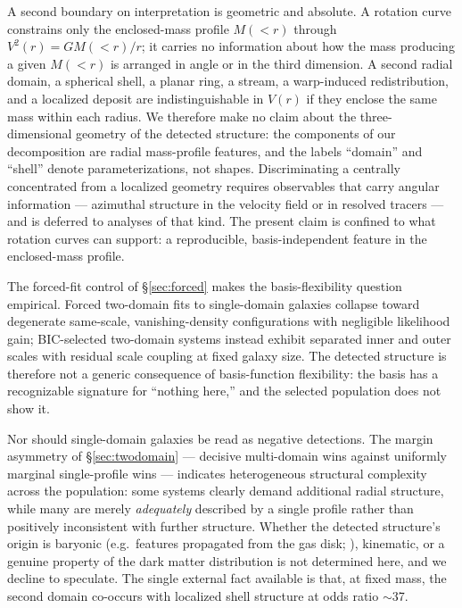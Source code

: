 \documentclass[twocolumn]{aastex631}
\begin{document}
A second boundary on interpretation is geometric and absolute. A rotation curve
constrains only the enclosed-mass profile $M({<}r)$ through $V^2(r) = G
M({<}r)/r$; it carries no information about how the mass producing a given
$M({<}r)$ is arranged in angle or in the third dimension. A second radial domain,
a spherical shell, a planar ring, a stream, a warp-induced redistribution, and a
localized deposit are indistinguishable in $V(r)$ if they enclose the same mass
within each radius. We therefore make no claim about the three-dimensional
geometry of the detected structure: the components of our decomposition are
radial mass-profile features, and the labels ``domain'' and ``shell'' denote
parameterizations, not shapes. Discriminating a centrally concentrated from a
localized geometry requires observables that carry angular information ---
azimuthal structure in the velocity field or in resolved tracers --- and is
deferred to analyses of that kind. The present claim is confined to what
rotation curves can support: a reproducible, basis-independent feature in the
enclosed-mass profile.

The forced-fit control of \S\ref{sec:forced} makes the basis-flexibility
question empirical. Forced two-domain fits to single-domain galaxies collapse
toward degenerate same-scale, vanishing-density configurations with
negligible likelihood gain; BIC-selected two-domain systems instead exhibit
separated inner and outer scales with residual scale coupling at fixed galaxy
size. The detected structure is therefore not a generic consequence of
basis-function flexibility: the basis has a recognizable signature for
``nothing here,'' and the selected population does not show it.

Nor should single-domain galaxies be read as negative detections. The margin
asymmetry of \S\ref{sec:twodomain} --- decisive multi-domain wins against
uniformly marginal single-profile wins --- indicates heterogeneous structural
complexity across the population: some systems clearly demand additional
radial structure, while many are merely \emph{adequately} described by a
single profile rather than positively inconsistent with further structure.
Whether the detected structure's origin is baryonic (e.g.\ features
propagated from the gas disk; \citealt{Sancisi2004}), kinematic, or a genuine
property of the dark matter distribution is not determined here, and we
decline to speculate. The single external fact available is that, at fixed
mass, the second domain co-occurs with localized shell structure at odds
ratio $\sim$37.
\end{document}
